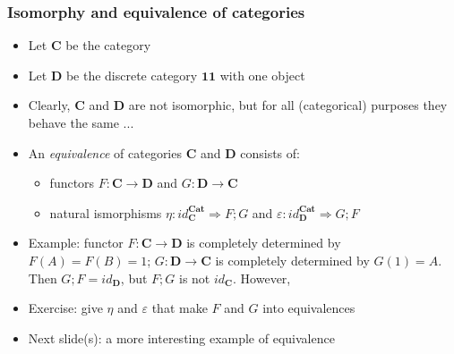 \documentclass[handout]{beamer}
\newcommand{\To}{\Rightarrow}
\newcommand{\bfsf}[1]{{\boldsymbol{#1}}}
\newcommand{\CC}{\bfsf{C}}
\newcommand{\DD}{\bfsf{D}}
\newcommand{\Cat}{\bfsf{Cat}}
\begin{document}
\frame
  {   
    \frametitle{Isomorphy and equivalence of categories}\label{Ch3:EqCat}

 \begin{itemize}[<+->]
\item Let $\CC$ be the category 
\item Let $\DD$ be the discrete category $\bfsf{1\!\!1}$ with one object
\item Clearly, $\CC$ and $\DD$ are not isomorphic, but for
all (categorical) purposes they behave the same ...
\item An \emph{equivalence} of categories $\CC$ and $\DD$
consists of: %
 \begin{itemize}
\item functors  $F :\CC\to\DD$ and $G:\DD\to\CC$
\item natural ismorphisms $\eta: id^\Cat_\CC \To F;G$ and $\varepsilon :  id^\Cat_\DD \To G;F$
 \end{itemize}
\item Example: functor $F: \CC\to\DD$ is completely determined by $F(A)=F(B)= 1$;
 $G: \DD\to\CC$ is completely determined by $G(1)=A$. 
Then $G;F = id_\DD$, but $F;G$ is {\color{red}not} $id_\CC$. However,
\item Exercise: give $\eta$ and $\varepsilon$ that make $F$ and $G$ into equivalences
\item Next slide(s): a more interesting example of equivalence
 \end{itemize}

 }
\end{document}
